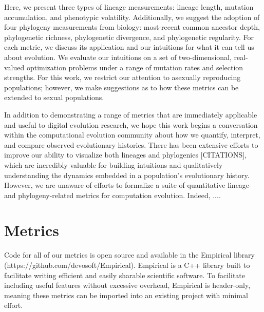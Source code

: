 \documentclass[letterpaper]{article}
\begin{document}
Here, we present three types of lineage measurements: lineage length, mutation accumulation, and phenotypic volatility. Additionally, we suggest the adoption of four phylogeny measurements from biology: most-recent common ancestor depth, phylogenetic richness, phylogenetic divergence, and phylogenetic regularity. For each metric, we discuss its application and our intuitions for what it can tell us about evolution. We evaluate our intuitions on a set of two-dimensional, real-valued optimization problems under a range of mutation rates and selection strengths. For this work, we restrict our attention to asexually reproducing populations; however, we make suggestions as to how these metrics can be extended to sexual populations. 

In addition to demonstrating a range of metrics that are immediately applicable and useful to digital evolution research, we hope this work begins a conversation within the computational evolution community about how we quantify, interpret, and compare observed evolutionary histories. There has been extensive efforts to improve our ability to visualize both lineages and phylogenies [CITATIONS], which are incredibly valuable for building intuitions and qualitatively understanding the dynamics embedded in a population's evolutionary history. However, we are unaware of efforts to formalize a suite of quantitative lineage- and phylogeny-related metrics for computation evolution. Indeed, .... %

\section{Metrics}

Code for all of our metrics is open source and available in the Empirical library (https://github.com/devosoft/Empirical). Empirical is a C++ library built to facilitate writing efficient and easily sharable scientific software. To facilitate including useful features without excessive overhead, Empirical is header-only, meaning these metrics can be imported into an existing project with minimal effort.
\end{document}
